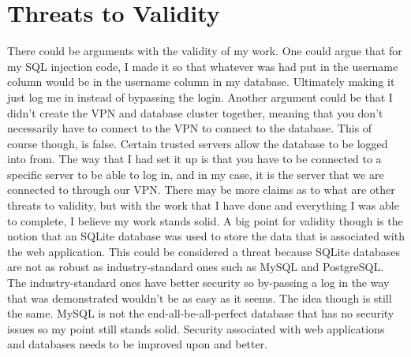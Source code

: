 \section{Threats to Validity}

There could be arguments with the validity of my work. One could argue
that for my SQL injection code, I made it so that whatever was had put in the username
column would be in the username column in my database. Ultimately making it just
log me in instead of bypassing the login. Another argument could be that
I didn't create the VPN and database cluster together, meaning that you don't necessarily have to connect to the VPN to connect to the database. This of course
though, is false. Certain trusted servers allow the database to be logged
into from. The way that I had set it up is that you have to be connected
to a specific server to be able to log in, and in my case, it is the server
that we are connected to through our VPN. There may be more claims as to what are
other threats to validity, but with the work that I have done and everything I was
able to complete, I believe my work stands solid. A big point for validity though is the notion
that an SQLite database was used to store the data that is associated with the web application. This could be considered a threat because SQLite databases are not as robust as industry-standard ones such as MySQL and PostgreSQL. The industry-standard ones have better security so by-passing a log in the way that was demonstrated wouldn't be as easy as it seems. The idea though is still the same. MySQL is not the end-all-be-all-perfect database that has no security issues so my point still stands solid. Security associated with web applications and databases needs to be improved upon and better.